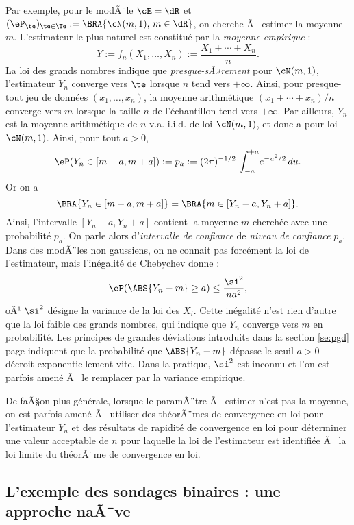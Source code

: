 Par exemple, pour le modÃ¨le $\cE=\dR$ et
$(\eP_\te)_{\te\in\Te}:=\BRA{\cN(m,1),\,m\in\dR}$, on cherche Ã  estimer la moyenne
$m$. L'estimateur le plus naturel est constitué par la \emph{moyenne
  empirique} :
$$
Y:=f_n(X_1,\ldots,X_n):=\frac{X_1+\cdots+X_n}{n}.
$$
La loi des grands nombres indique que \emph{presque-sÃ»rement} pour
$\cN(m,1)$, l'estimateur $Y_n$ converge vers $\te$ lorsque $n$ tend vers $+\infty$.
Ainsi, pour presque-tout jeu de données $(x_1,\ldots,x_n)$, la moyenne arithmétique
$(x_1+\cdots+x_n)/n$ converge vers $m$ lorsque la taille $n$ de l'échantillon tend
vers $+\infty$.  Par ailleurs, $Y_n$ est la moyenne arithmétique de $n$ v.a. i.i.d.
de loi $\cN(m,1)$, et donc a pour loi $\cN(m,1)$. Ainsi, pour tout $a>0$,
$$
\eP(Y_n\in [m-a,m+a]):=p_a:=(2\pi)^{-1/2}\,\int_{-a}^{+a}\!e^{-u^2/2}\,du.
$$
Or on a
$$
\BRA{Y_n\in [m-a,m+a]}=\BRA{m\in[Y_n-a,Y_n+a]}.
$$
Ainsi, l'intervalle $[Y_n-a,Y_n+a]$ contient la moyenne $m$ cherchée avec
une probabilité $p_a$. On parle alors d'\emph{intervalle de confiance} de
\emph{niveau de confiance} $p_a$. Dans des modÃ¨les non gaussiens, on ne
connait pas forcément la loi de l'estimateur, mais l'inégalité de Chebychev
donne :
$$
\eP(\ABS{Y_n-m} \geq a) \leq \frac{\si^2}{na^2},
$$
oÃ¹ $\si^2$ désigne la variance de la loi des $X_i$. Cette inégalité n'est
rien d'autre que la loi faible des grands nombres, qui indique que $Y_n$
converge vers $m$ en probabilité. Les principes de grandes déviations
introduits dans la section \ref{se:pgd} page \pageref{se:pgd} indiquent que la
probabilité que $\ABS{Y_n-m}$ dépasse le seuil $a>0$ décroit exponentiellement
vite. Dans la pratique, $\si^2$ est inconnu et l'on est parfois amené Ã  le
remplacer par la variance empirique.

De faÃ§on plus générale, lorsque le paramÃ¨tre Ã  estimer n'est pas la moyenne,
on est parfois amené Ã  utiliser des théorÃ¨mes de convergence en loi pour
l'estimateur $Y_n$ et des résultats de rapidité de convergence en loi pour
déterminer une valeur acceptable de $n$ pour laquelle la loi de l'estimateur
est identifiée Ã  la loi limite du théorÃ¨me de convergence en loi.

\subsection{L'exemple des sondages binaires : une approche naÃ¯ve}

